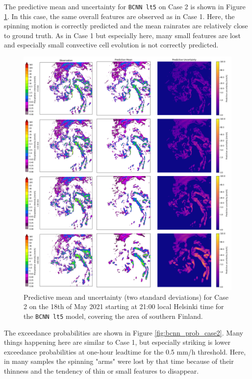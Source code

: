 The predictive mean and uncertainty for \texttt{BCNN lt5} on Case 2 is shown in Figure \ref{fig:bcnn_mean_case2}. In this case, the same overall features are observed as in Case 1. Here, the spinning motion is correctly predicted and the mean rainrates are relatively close to ground truth. As in Case 1 but especially here, many small features are lost and especially small convective cell evolution is not correctly predicted. 

\begin{figure}[H]
	\centering
	\includegraphics[width=\textwidth]{images/cases/bcnn_mean_case2}
	\caption{Predictive mean and uncertainty (two standard deviations) for Case 2 on the 18th of May 2021 starting at 21:00 local Helsinki time for the \texttt{BCNN lt5} model, covering the area of southern Finland.}
	\label{fig:bcnn_mean_case2}
\end{figure}

The exceedance probabilities are shown in Figure \ref{fig:bcnn_prob_case2}. Many things happening here are similar to Case 1, but especially striking is lower exceedance probabilities at one-hour leadtime for the 0.5 mm/h threshold. Here, in many samples the spinning "arms" were lost by that time because of their thinness and the tendency of thin or small features to disappear. 


